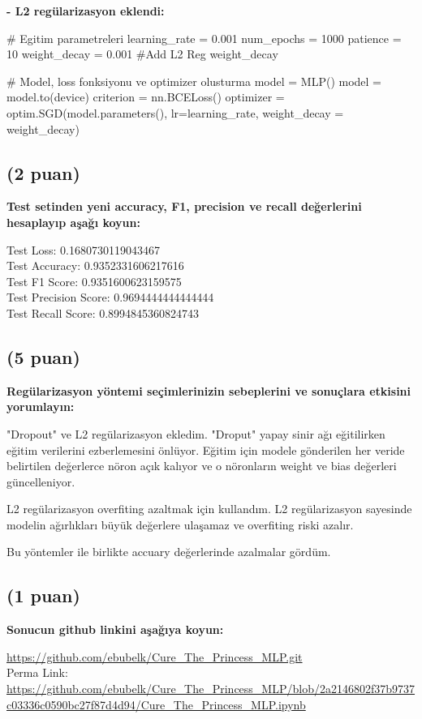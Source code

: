 \documentclass[11pt]{article}
\begin{document}
\textbf{- L2 regülarizasyon eklendi:}
\begin{python}
# Egitim parametreleri
learning_rate = 0.001
num_epochs = 1000
patience = 10
weight_decay = 0.001 #Add L2 Reg weight_decay

# Model, loss fonksiyonu ve optimizer olusturma
model = MLP()
model = model.to(device)
criterion = nn.BCELoss()
optimizer = optim.SGD(model.parameters(), lr=learning_rate, weight_decay = weight_decay)
\end{python}

\subsection{(2 puan)} \textbf{Test setinden yeni accuracy, F1, precision ve recall değerlerini hesaplayıp aşağı koyun:}

Test Loss: 0.1680730119043467\\
Test Accuracy: 0.9352331606217616\\
Test F1 Score: 0.9351600623159575\\
Test Precision Score: 0.9694444444444444\\
Test Recall Score: 0.8994845360824743
\subsection{(5 puan)} \textbf{Regülarizasyon yöntemi seçimlerinizin sebeplerini ve sonuçlara etkisini yorumlayın:}

"Dropout" ve L2 regülarizasyon ekledim. "Droput" yapay sinir ağı eğitilirken eğitim verilerini ezberlemesini önlüyor. Eğitim için modele gönderilen her veride belirtilen değerlerce nöron açık kalıyor ve o nöronların weight ve bias değerleri güncelleniyor.

L2 regülarizasyon overfiting azaltmak için kullandım. L2 regülarizasyon sayesinde modelin ağırlıkları büyük değerlere ulaşamaz ve overfiting riski azalır.

Bu yöntemler ile birlikte accuary değerlerinde azalmalar gördüm.

\subsection{(1 puan)} \textbf{Sonucun github linkini  aşağıya koyun:}

\url{https://github.com/ebubelk/Cure_The_Princess_MLP.git}\\
Perma Link:\\
\url{https://github.com/ebubelk/Cure_The_Princess_MLP/blob/2a2146802f37b9737c03336c0590bc27f87d4d94/Cure_The_Princess_MLP.ipynb}
\end{document}
